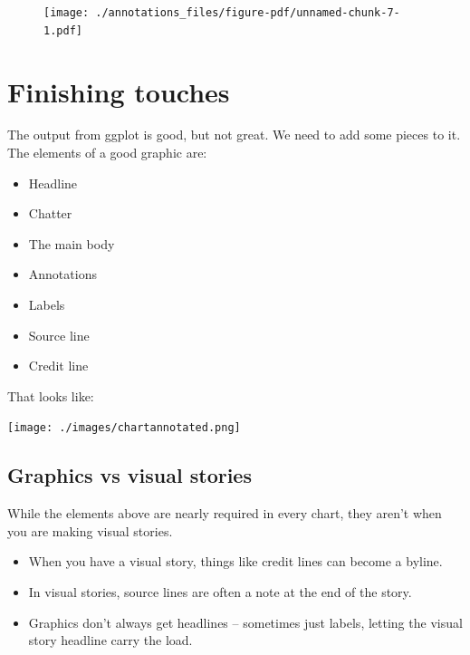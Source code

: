\documentclass[
  letterpaper,
  DIV=11,
  numbers=noendperiod]{scrreprt}
\providecommand{\tightlist}{%
  \setlength{\itemsep}{0pt}\setlength{\parskip}{0pt}}\usepackage{longtable,booktabs,array}
\begin{document}
\begin{figure}[H]

{\centering \texttt{[image: ./annotations\_files/figure-pdf/unnamed-chunk-7-1.pdf]}

}

\end{figure}


\hypertarget{finishing-touches}{%
\chapter{Finishing touches}\label{finishing-touches}}

The output from ggplot is good, but not great. We need to add some
pieces to it. The elements of a good graphic are:

\begin{itemize}
\tightlist
\item
  Headline
\item
  Chatter
\item
  The main body
\item
  Annotations
\item
  Labels
\item
  Source line
\item
  Credit line
\end{itemize}

That looks like:

\texttt{[image: ./images/chartannotated.png]}

\hypertarget{graphics-vs-visual-stories}{%
\section{Graphics vs visual stories}\label{graphics-vs-visual-stories}}

While the elements above are nearly required in every chart, they aren't
when you are making visual stories.

\begin{itemize}
\tightlist
\item
  When you have a visual story, things like credit lines can become a
  byline.
\item
  In visual stories, source lines are often a note at the end of the
  story.
\item
  Graphics don't always get headlines -- sometimes just labels, letting
  the visual story headline carry the load.
\end{itemize}
\end{document}
